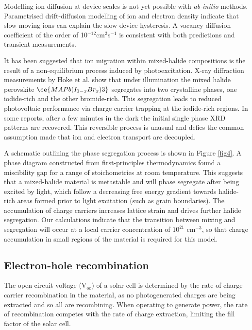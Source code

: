 Modelling ion diffusion at device scales is not yet possible with \emph{ab-initio} methods.
Parametrised drift-diffusion modelling of ion and electron density indicate that slow moving ions can explain the slow device hysteresis.\autocite{VanReenen2015,Richardson2016} 
A vacancy diffusion coefficient of the order of 10$^{-12}$cm$^2$s$^{-1}$ is consistent with both predictions and transient measurements.\autocite{Eames2015a}

It has been suggested that ion migration within mixed-halide compositions is the result of a non-equilibrium process induced by photoexcitation.
X-ray diffraction measurements by Hoke et al.\autocite{Hoke2015} show that under illumination the mixed halide perovskite $\ce{MAPb(I_{1-x}Br_x)3}$ segregates into two crystalline phases, one iodide-rich and the other bromide-rich.
This segregation leads to reduced photovoltaic performance via charge carrier trapping at the iodide-rich regions.
In some reports, after a few minutes in the dark the initial single phase XRD patterns are recovered. 
This reversible process is unusual and defies the common assumption made that ion and electron transport are decoupled.

A schematic outlining the phase segregation process is shown in Figure \ref{fig4}.
A phase diagram constructed from first-principles thermodynamics found a miscibility gap for a range of stoichometries at room temperature.\autocite{Brivio2016}
This suggests that a mixed-halide material is metastable and will phase segregate after being excited by light, which follow a decreasing free energy gradient towards halide-rich areas formed prior to light excitation (such as grain boundaries).
The accumulation of charge carriers increases lattice strain and drives further halide segregation.  
Our calculations indicate that the transition between mixing and segregation will occur at a local carrier concentration of $10^{21}$ cm$^{-3}$, so that charge accumulation in small regions of the material is required for this model. 

\subsection{Electron-hole recombination} \label{EHR}

The open-circuit voltage (V$_\textrm{oc}$) of a solar cell is determined by the rate of charge carrier recombination in the material, as no photogenerated charges are being extracted and so all are recombining. 
When operating to generate power, the rate of recombination competes with the rate of charge extraction, limiting the fill factor of the solar cell. 

